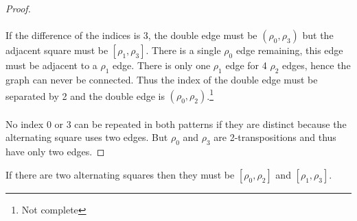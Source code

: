 \begin{proof}
  \paragraph{}
  If the difference of the indices is 3, the double edge must be $(\rho_0, \rho_3)$ but the adjacent square must be $[\rho_1, \rho_3]$. There is a single $\rho_0$ edge remaining, this edge must be adjacent to a $\rho_1$ edge. There is only one $\rho_1$ edge for 4 $\rho_2$ edges, hence the graph can never be connected. Thus the index of the double edge must be separated by 2 and the double edge is $(\rho_0, \rho_2)$.\footnote{Not complete}

  \paragraph{}
  No index 0 or 3 can be repeated in both patterns if they are distinct because the alternating square uses two edges. But $\rho_0$ and $\rho_3$ are 2-transpositions and thus have only two edges.

\end{proof}

\begin{lemma}
  If there are two alternating squares then they must be $[\rho_0, \rho_2]$ and $[\rho_1, \rho_3]$.
\end{lemma}


